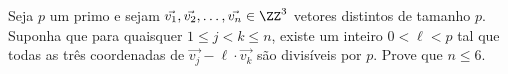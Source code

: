 Seja $p$ um primo e sejam $\vec{v_1},\vec{v_2},\dotsc ,\vec{v_n} \in \ZZ^3$ vetores distintos de tamanho $p$. Suponha que para quaisquer $1\leqslant j<k\leqslant n$, existe um inteiro $ 0 < \ell <p $ tal que todas as três coordenadas de $\vec{v_j} -\ell \cdot \vec{v_k} $ são divisíveis por $p$. Prove que $n\leqslant 6$.
